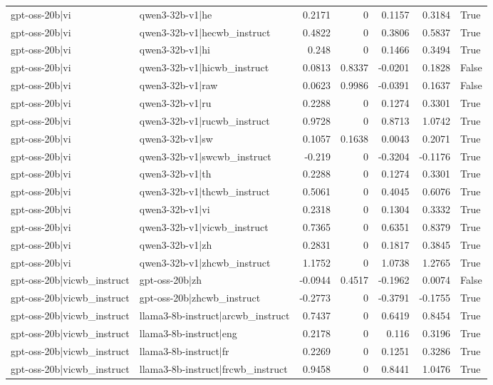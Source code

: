 \begin{table}
\begin{tabular}{l l r r r r l}
gpt-oss-20b|vi & qwen3-32b-v1|he & 0.2171 & 0 & 0.1157 & 0.3184 & True \\
gpt-oss-20b|vi & qwen3-32b-v1|hecwb_instruct & 0.4822 & 0 & 0.3806 & 0.5837 & True \\
gpt-oss-20b|vi & qwen3-32b-v1|hi & 0.248 & 0 & 0.1466 & 0.3494 & True \\
gpt-oss-20b|vi & qwen3-32b-v1|hicwb_instruct & 0.0813 & 0.8337 & -0.0201 & 0.1828 & False \\
gpt-oss-20b|vi & qwen3-32b-v1|raw & 0.0623 & 0.9986 & -0.0391 & 0.1637 & False \\
gpt-oss-20b|vi & qwen3-32b-v1|ru & 0.2288 & 0 & 0.1274 & 0.3301 & True \\
gpt-oss-20b|vi & qwen3-32b-v1|rucwb_instruct & 0.9728 & 0 & 0.8713 & 1.0742 & True \\
gpt-oss-20b|vi & qwen3-32b-v1|sw & 0.1057 & 0.1638 & 0.0043 & 0.2071 & True \\
gpt-oss-20b|vi & qwen3-32b-v1|swcwb_instruct & -0.219 & 0 & -0.3204 & -0.1176 & True \\
gpt-oss-20b|vi & qwen3-32b-v1|th & 0.2288 & 0 & 0.1274 & 0.3301 & True \\
gpt-oss-20b|vi & qwen3-32b-v1|thcwb_instruct & 0.5061 & 0 & 0.4045 & 0.6076 & True \\
gpt-oss-20b|vi & qwen3-32b-v1|vi & 0.2318 & 0 & 0.1304 & 0.3332 & True \\
gpt-oss-20b|vi & qwen3-32b-v1|vicwb_instruct & 0.7365 & 0 & 0.6351 & 0.8379 & True \\
gpt-oss-20b|vi & qwen3-32b-v1|zh & 0.2831 & 0 & 0.1817 & 0.3845 & True \\
gpt-oss-20b|vi & qwen3-32b-v1|zhcwb_instruct & 1.1752 & 0 & 1.0738 & 1.2765 & True \\
gpt-oss-20b|vicwb_instruct & gpt-oss-20b|zh & -0.0944 & 0.4517 & -0.1962 & 0.0074 & False \\
gpt-oss-20b|vicwb_instruct & gpt-oss-20b|zhcwb_instruct & -0.2773 & 0 & -0.3791 & -0.1755 & True \\
gpt-oss-20b|vicwb_instruct & llama3-8b-instruct|arcwb_instruct & 0.7437 & 0 & 0.6419 & 0.8454 & True \\
gpt-oss-20b|vicwb_instruct & llama3-8b-instruct|eng & 0.2178 & 0 & 0.116 & 0.3196 & True \\
gpt-oss-20b|vicwb_instruct & llama3-8b-instruct|fr & 0.2269 & 0 & 0.1251 & 0.3286 & True \\
gpt-oss-20b|vicwb_instruct & llama3-8b-instruct|frcwb_instruct & 0.9458 & 0 & 0.8441 & 1.0476 & True \\

\end{tabular}
\end{table}
